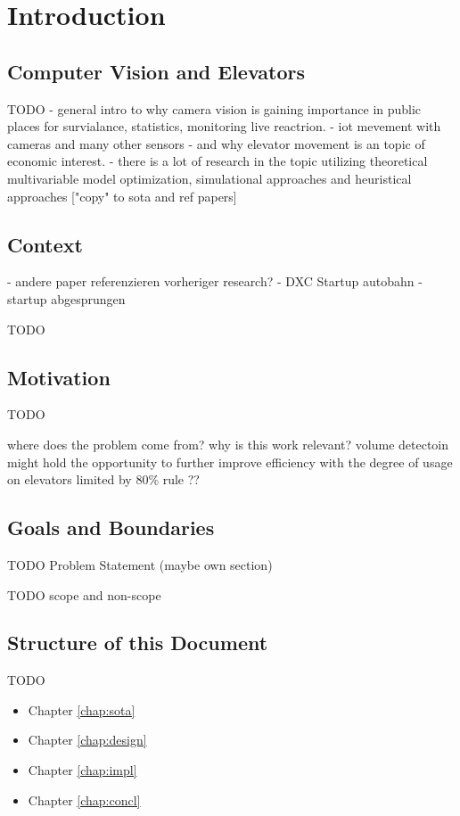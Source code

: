 \chapter{Introduction}
\label{chap:intro}

\section{Computer Vision and Elevators}


\autocite{reddy2013foreground}

TODO
- general intro to why camera vision is gaining importance in public places for survialance, statistics, monitoring live reactrion. 
- iot mevement with cameras and many other sensors
- and why elevator movement is an topic of economic interest.
- there is a lot of research in the topic utilizing theoretical multivariable model optimization, simulational approaches and heuristical approaches ["copy" to sota and ref papers]


\section{Context}

- andere paper referenzieren vorheriger research?
- DXC Startup autobahn 
- startup abgesprungen

TODO

\section{Motivation}


TODO

where does the problem come from?
why is this work relevant?
volume detectoin might hold the opportunity to further improve efficiency with the degree of usage on elevators
limited by 80\% rule ??

\section{Goals and Boundaries}

TODO Problem Statement (maybe own section)

TODO scope and non-scope

\section{Structure of this Document}

TODO

\begin{itemize}
    \item Chapter \ref{chap:sota}
    \item Chapter \ref{chap:design}
    \item Chapter \ref{chap:impl}
    \item Chapter \ref{chap:concl}
\end{itemize}